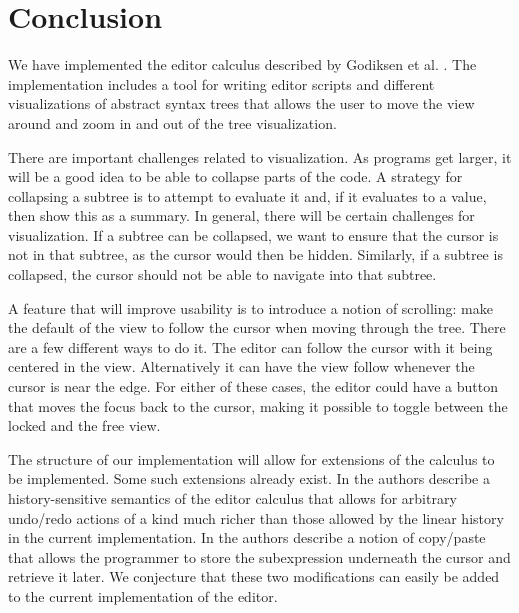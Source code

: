 \section{Conclusion}
\label{conclusion}

We have implemented the editor calculus described by Godiksen et
al. \pepm. The implementation includes a tool for writing editor
scripts and different visualizations of abstract syntax trees that
allows the user to move the view around and zoom in and out of the
tree visualization.

There are important challenges related to visualization. As programs
get larger, it will be a good idea to be able to collapse parts of the
code. A strategy for collapsing a subtree is to attempt to evaluate it
and, if it evaluates to a value, then show this as a summary.  In
general, there will be certain challenges for visualization. If a
subtree can be collapsed, we want to ensure that the cursor is not in
that subtree, as the cursor would then be hidden. Similarly, if a
subtree is collapsed, the cursor should not be able to navigate into
that subtree.

A feature that will improve usability is to introduce a notion of
scrolling: make the default of the view to follow the cursor when
moving through the tree. There are a few different ways to do it. The
editor can follow the cursor with it being centered in the
view. Alternatively it can have the view follow whenever the cursor is
near the edge. For either of these cases, the editor could have a
button that moves the focus back to the cursor, making it possible to
toggle between the locked and the free view.

The structure of our implementation will allow for extensions of the
calculus to be implemented. Some such extensions already exist.
In \cite{DBLP:conf/synasc/KjaerLMH21} the authors describe a
history-sensitive semantics of the editor calculus that allows for
arbitrary undo/redo actions of a kind much richer than those allowed by the
linear history in the current implementation. In \cite{ifl2022} the
authors describe a notion of copy/paste that allows the programmer to
store the subexpression underneath the cursor and retrieve it
later. We conjecture that these two modifications can easily be added
to the current implementation of the editor.

